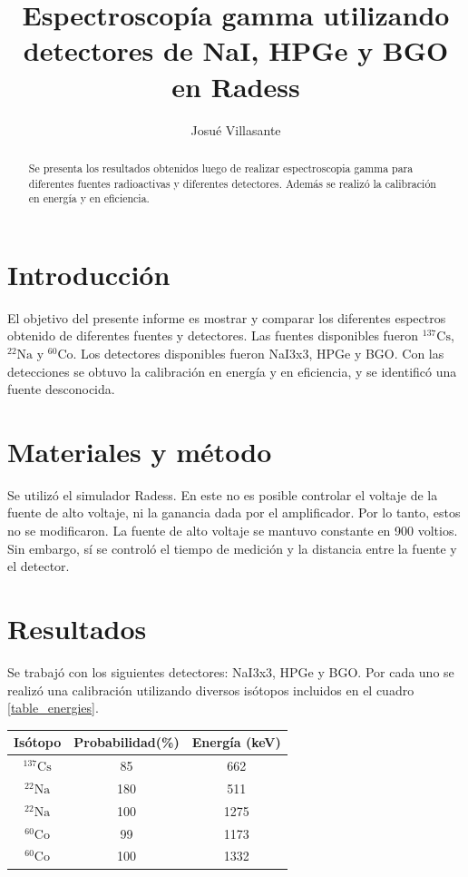 \documentclass[a4paper, onecolumn]{article}
\author{Josué Villasante}
\title{Espectroscopía gamma utilizando detectores de NaI, HPGe y BGO en Radess}
\begin{document}
	\maketitle
	\begin{abstract}
		Se presenta los resultados obtenidos luego de realizar espectroscopia gamma para diferentes fuentes radioactivas y diferentes detectores. Además se realizó la calibración en energía y en eficiencia.
	\end{abstract}

	\section{Introducción}
		El objetivo del presente informe es mostrar y comparar los diferentes espectros obtenido de diferentes fuentes y detectores. Las fuentes disponibles fueron ${}^{137}\mathrm{Cs}$, ${}^{22}\mathrm{Na}$ y ${}^{60}\mathrm{Co}$. Los detectores disponibles fueron NaI3x3, HPGe y BGO. Con las detecciones se obtuvo la calibración en energía y en eficiencia, y se identificó una fuente desconocida.
	\section{Materiales y método}
		Se utilizó el simulador Radess. En este no es posible controlar el voltaje de la fuente de alto voltaje, ni la ganancia dada por el amplificador. Por lo tanto, estos no se modificaron. La fuente de alto voltaje se mantuvo constante en 900 voltios. Sin embargo, sí se controló el tiempo de medición y la distancia entre la fuente y el detector.

	\section{Resultados}	
		Se trabajó con los siguientes detectores: NaI3x3, HPGe y BGO. Por cada uno se realizó una calibración utilizando diversos isótopos incluidos en el cuadro \ref{table_energies}.

		\begin{center}
			{\renewcommand{\arraystretch}{1.5}
			\renewcommand{\tabcolsep}{0.2cm}
			\label{table_energies}
			\begin{tabular}{ c c c }
				\hline
				Isótopo & Probabilidad(\%) & Energía (keV) \\
				\hline
				${}^{137}\mathrm{Cs}$ & 85 & 662 \\ 
				${}^{22}\mathrm{Na}$ & 180 & 511 \\ 
				${}^{22}\mathrm{Na}$ & 100 & 1275 \\ 
				${}^{60}\mathrm{Co}$ & 99 & 1173 \\ 
				${}^{60}\mathrm{Co}$ & 100 & 1332
			\end{tabular}}
		\end{center}
\end{document}
